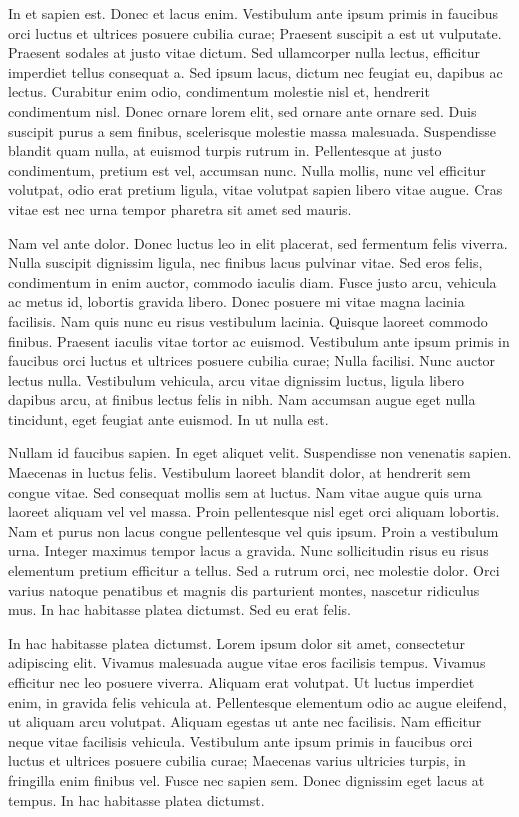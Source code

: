 \documentclass[12pt, a4paper]{article}
\begin{document}
In et sapien est. Donec et lacus enim. Vestibulum ante ipsum primis in faucibus orci luctus et ultrices posuere cubilia curae; Praesent suscipit a est ut vulputate. Praesent sodales at justo vitae dictum. Sed ullamcorper nulla lectus, efficitur imperdiet tellus consequat a. Sed ipsum lacus, dictum nec feugiat eu, dapibus ac lectus. Curabitur enim odio, condimentum molestie nisl et, hendrerit condimentum nisl. Donec ornare lorem elit, sed ornare ante ornare sed. Duis suscipit purus a sem finibus, scelerisque molestie massa malesuada. Suspendisse blandit quam nulla, at euismod turpis rutrum in. Pellentesque at justo condimentum, pretium est vel, accumsan nunc. Nulla mollis, nunc vel efficitur volutpat, odio erat pretium ligula, vitae volutpat sapien libero vitae augue. Cras vitae est nec urna tempor pharetra sit amet sed mauris.

Nam vel ante dolor. Donec luctus leo in elit placerat, sed fermentum felis viverra. Nulla suscipit dignissim ligula, nec finibus lacus pulvinar vitae. Sed eros felis, condimentum in enim auctor, commodo iaculis diam. Fusce justo arcu, vehicula ac metus id, lobortis gravida libero. Donec posuere mi vitae magna lacinia facilisis. Nam quis nunc eu risus vestibulum lacinia. Quisque laoreet commodo finibus. Praesent iaculis vitae tortor ac euismod. Vestibulum ante ipsum primis in faucibus orci luctus et ultrices posuere cubilia curae; Nulla facilisi. Nunc auctor lectus nulla. Vestibulum vehicula, arcu vitae dignissim luctus, ligula libero dapibus arcu, at finibus lectus felis in nibh. Nam accumsan augue eget nulla tincidunt, eget feugiat ante euismod. In ut nulla est.

Nullam id faucibus sapien. In eget aliquet velit. Suspendisse non venenatis sapien. Maecenas in luctus felis. Vestibulum laoreet blandit dolor, at hendrerit sem congue vitae. Sed consequat mollis sem at luctus. Nam vitae augue quis urna laoreet aliquam vel vel massa. Proin pellentesque nisl eget orci aliquam lobortis. Nam et purus non lacus congue pellentesque vel quis ipsum. Proin a vestibulum urna. Integer maximus tempor lacus a gravida. Nunc sollicitudin risus eu risus elementum pretium efficitur a tellus. Sed a rutrum orci, nec molestie dolor. Orci varius natoque penatibus et magnis dis parturient montes, nascetur ridiculus mus. In hac habitasse platea dictumst. Sed eu erat felis.

In hac habitasse platea dictumst. Lorem ipsum dolor sit amet, consectetur adipiscing elit. Vivamus malesuada augue vitae eros facilisis tempus. Vivamus efficitur nec leo posuere viverra. Aliquam erat volutpat. Ut luctus imperdiet enim, in gravida felis vehicula at. Pellentesque elementum odio ac augue eleifend, ut aliquam arcu volutpat. Aliquam egestas ut ante nec facilisis. Nam efficitur neque vitae facilisis vehicula. Vestibulum ante ipsum primis in faucibus orci luctus et ultrices posuere cubilia curae; Maecenas varius ultricies turpis, in fringilla enim finibus vel. Fusce nec sapien sem. Donec dignissim eget lacus at tempus. In hac habitasse platea dictumst.
\end{document}
